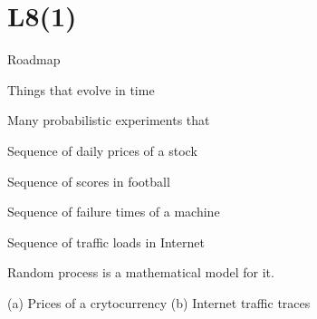 \section{L8(1)}
\begin{frame}{Roadmap}

\plitemsep 0.2in

\bce[(1)]

\item {}
\item {}

\ece

\end{frame}


\begin{frame}{Things that evolve in time}


{
\plitemsep 0.1in
\bci
\item<1-> Many probabilistic experiments that 
\bci
\item<2-> Sequence of daily prices of a stock
\item<2-> Sequence of scores in football
\item<2-> Sequence of failure times of a machine
\item<2-> Sequence of traffic loads in Internet
\eci

\item<3-> Random process is a mathematical model for it.



\eci
}
{
  \vspace{-0.5cm}
  \scriptsize
  \centering
  \centering (a) Prices of a crytocurrency
  \centering (b) Internet traffic traces
}
\end{frame}


